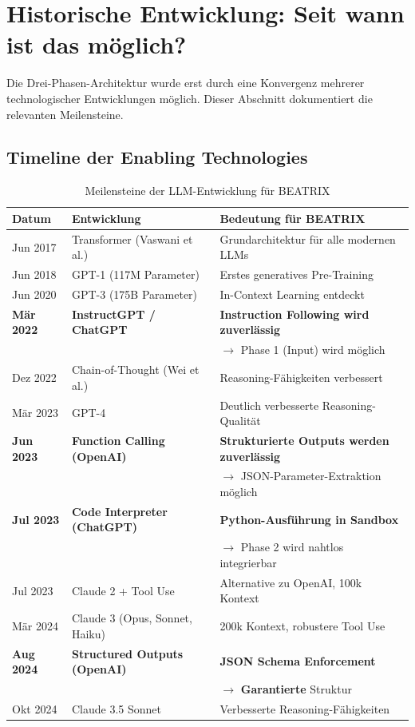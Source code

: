 \documentclass[12pt,a4paper]{article}
\begin{document}
\section{Historische Entwicklung: Seit wann ist das möglich?}

Die Drei-Phasen-Architektur wurde erst durch eine Konvergenz mehrerer technologischer Entwicklungen möglich.
Dieser Abschnitt dokumentiert die relevanten Meilensteine.

\subsection{Timeline der Enabling Technologies}

\begin{table}[h]
\centering
\caption{Meilensteine der LLM-Entwicklung für BEATRIX}
\small
\begin{tabular}{@{}llp{7cm}@{}}
\toprule
\textbf{Datum} & \textbf{Entwicklung} & \textbf{Bedeutung für BEATRIX} \\
\midrule
Jun 2017 & Transformer (Vaswani et al.) & Grundarchitektur für alle modernen LLMs \\
Jun 2018 & GPT-1 (117M Parameter) & Erstes generatives Pre-Training \\
Jun 2020 & GPT-3 (175B Parameter) & In-Context Learning entdeckt \\
\midrule
\textbf{Mär 2022} & \textbf{InstructGPT / ChatGPT} & \textbf{Instruction Following wird zuverlässig} \\
& & $\rightarrow$ Phase 1 (Input) wird möglich \\
Dez 2022 & Chain-of-Thought (Wei et al.) & Reasoning-Fähigkeiten verbessert \\
\midrule
Mär 2023 & GPT-4 & Deutlich verbesserte Reasoning-Qualität \\
\textbf{Jun 2023} & \textbf{Function Calling (OpenAI)} & \textbf{Strukturierte Outputs werden zuverlässig} \\
& & $\rightarrow$ JSON-Parameter-Extraktion möglich \\
\textbf{Jul 2023} & \textbf{Code Interpreter (ChatGPT)} & \textbf{Python-Ausführung in Sandbox} \\
& & $\rightarrow$ Phase 2 wird nahtlos integrierbar \\
Jul 2023 & Claude 2 + Tool Use & Alternative zu OpenAI, 100k Kontext \\
\midrule
Mär 2024 & Claude 3 (Opus, Sonnet, Haiku) & 200k Kontext, robustere Tool Use \\
\textbf{Aug 2024} & \textbf{Structured Outputs (OpenAI)} & \textbf{JSON Schema Enforcement} \\
& & $\rightarrow$ \textbf{Garantierte} Struktur \\
Okt 2024 & Claude 3.5 Sonnet & Verbesserte Reasoning-Fähigkeiten \\
\bottomrule
\end{tabular}
\end{table}
\end{document}
